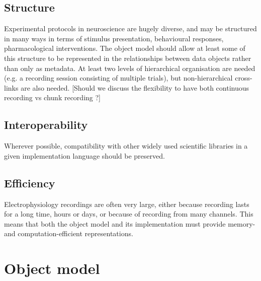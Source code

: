\documentclass{frontiers}
\newcommand{\samuel}[1]{[\textcolor{RubineRed}{#1}]}
\begin{document}
\subsection{Structure}

Experimental protocols in neuroscience are hugely diverse, and may be structured in many ways in terms of stimulus presentation, behavioural responses, pharmacological interventions. The object model should allow at least some of this structure to be represented in the relationships between data objects rather than only as metadata. At least two levels of hierarchical organisation are needed (e.g. a recording session consisting of multiple trials), but non-hierarchical cross-links are also needed.
\samuel{Should we discuss the flexibility to have both continuous recording vs chunk recording ?}

\subsection{Interoperability}

Wherever possible, compatibility with other widely used scientific libraries in a given implementation language should be preserved.

\subsection{Efficiency}

Electrophysiology recordings are often very large, either because recording lasts for a long time, hours or days, or because of recording from many channels. This means that both the object model and its implementation must provide memory- and computation-efficient representations.


\section{Object model}

\end{document}
